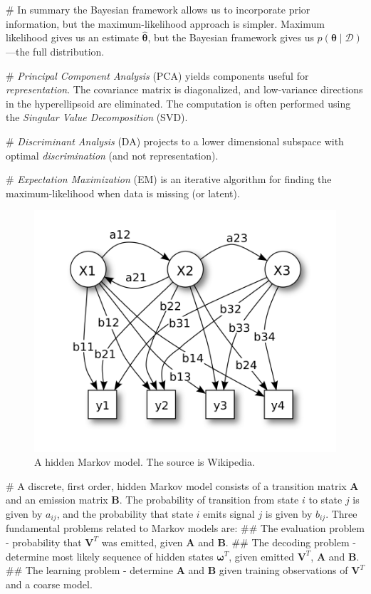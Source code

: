 \documentclass[12pt, a4paper]{article}
\newcommand{\D}{\mathcal{D}}
\newcommand{\vect}[1]{\bm{#1}}
\begin{document}
\begin{easylist}[itemize]
# In summary the Bayesian framework allows us to incorporate prior information, but the maximum-likelihood approach is simpler.
Maximum likelihood gives us an estimate $\hat{\vect{\theta}}$, but the Bayesian framework gives us $p(\vect{\theta}  \mid  \D)$---the full distribution.

# \emph{Principal Component Analysis} (PCA) yields components useful for \emph{representation}.
The covariance matrix is diagonalized, and low-variance directions in the hyperellipsoid are eliminated.
The computation is often performed using the \emph{Singular Value Decomposition} (SVD).

# \emph{Discriminant Analysis} (DA) projects to a lower dimensional subspace with optimal \emph{discrimination} (and not representation).

# \emph{Expectation Maximization} (EM) is an iterative algorithm for finding the maximum-likelihood when data is missing (or latent).

\begin{figure}[ht!]
	\centering
	\includegraphics[width=0.45\linewidth]{figs/hidden_markov}
	\caption{A hidden Markov model. The source is Wikipedia.}
	\label{fig:hidden_markov}
\end{figure}

# A discrete, first order, hidden Markov model consists of a transition matrix $\vect{A}$ and an emission matrix $\vect{B}$.
The probability of transition from state $i$ to state $j$ is given by $a_{ij}$, and the probability that state $i$ emits signal $j$ is given by $b_{ij}$.
Three fundamental problems related to Markov models are:
## The evaluation problem - probability that $\vect{V}^T$ was emitted, given $\vect{A}$ and $\vect{B}$.
## The decoding problem - determine most likely sequence of hidden states $\vect{\omega}^T$, given emitted $\vect{V}^T$, $\vect{A}$ and $\vect{B}$.
## The learning problem - determine $\vect{A}$ and $\vect{B}$ given training observations of $\vect{V}^T$ and a coarse model.



\end{easylist}
\end{document}
